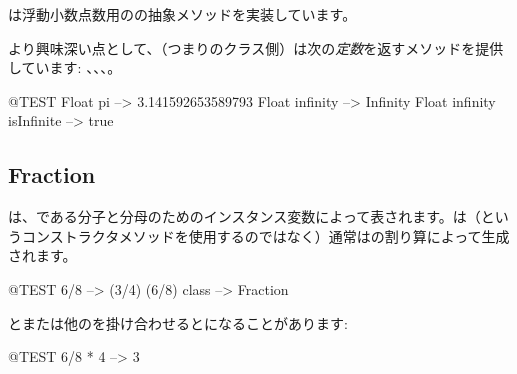 \documentclass[a4paper,10pt,twoside]{book}
\begin{document}
は浮動小数点数用のの抽象メソッドを実装しています。

より興味深い点として、（\ie つまりのクラス側）は次の\emph{定数}を返すメソッドを提供しています: 、、、。

\begin{code}{@TEST}
Float pi                      --> 3.141592653589793
Float infinity               --> Infinity
Float infinity isInfinite --> true
\end{code}

\subsection{Fraction}

は、である分子と分母のためのインスタンス変数によって表されます。は（というコンストラクタメソッドを使用するのではなく）通常はの割り算によって生成されます。

\begin{code}{@TEST}
6/8             --> (3/4)
(6/8) class --> Fraction
\end{code}

とまたは他のを掛け合わせるとになることがあります:

\begin{code}{@TEST}
6/8 * 4 --> 3
\end{code}

\end{document}
